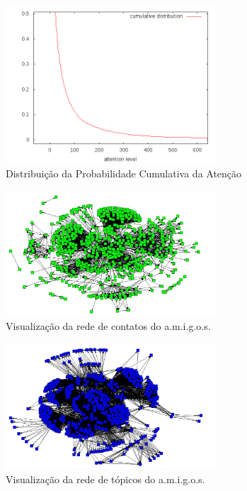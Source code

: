 \begin{figure}[h!]
  \centering
    \includegraphics[width=0.7\textwidth]{imgs/cdf-final.png}
  \caption{Distribuição da Probabilidade Cumulativa da Atenção}
    \label{ap:fig:cdf}
\end{figure}

\begin{figure}[h!]
  \centering
    \includegraphics[width=0.7\textwidth]{imgs/contatos.jpg}
  \caption{Visualização da rede de contatos do a.m.i.g.o.s.}
    \label{ap:fig:contatos}
\end{figure}

\begin{figure}[h!]
  \centering
    \includegraphics[width=0.7\textwidth]{imgs/topicos.jpg}
  \caption{Visualização da rede de tópicos do a.m.i.g.o.s.}
    \label{ap:fig:topicos}
\end{figure}

